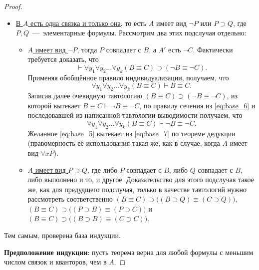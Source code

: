 \begin{proof}
\begin{itemize}
        \item \underline{В $A$ есть одна связка и только она}, то есть $A$ имеет вид $\neg P$ или $P \supset Q$, где $P, Q$~---~элементарные формулы. Рассмотрим два этих подслучая отдельно:
        \begin{itemize}
            \item \underline{$A$ имеет вид $\neg P$}, тогда $P$ совпадает с $B$, а $A'$ есть $\neg C$. Фактически требуется доказать, что
            \begin{equation}\label{eq:base_5}
                \vdash \forall y_1\forall y_2\dots\forall y_k(B \equiv C) \supset (\neg B \equiv \neg C).
            \end{equation}
            Применяя обобщённое правило индивидуализации, получаем, что 
            \begin{equation}\label{eq:base_6}
                \forall y_1\forall y_2\dots\forall y_k(B \equiv C) \vdash B \equiv C. 
            \end{equation}
            Записав далее очевидную тавтологию $(B \equiv C) \supset (\neg B \equiv \neg C)$, из которой вытекает $B \equiv C \vdash \neg B \equiv \neg C$, по правилу сечения из \eqref{eq:base_6} и последовавшей из написанной тавтологии выводимости получаем, что
            \begin{equation}\label{eq:base_7}
                \forall y_1\forall y_2\dots\forall y_k(B \equiv C) \vdash \neg B \equiv \neg C.
            \end{equation}
            Желанное \eqref{eq:base_5} вытекает из \eqref{eq:base_7} по теореме дедукции (правомерность её использования такая же, как в случае, когда $A$ имеет вид $\forall xP$).

            \item \underline{$A$ имеет вид $P \supset Q$}, где либо $P$ совпадает с $B$, либо $Q$ совпадает с $B$, либо выполнено и то, и другое. Доказательство для этого подслучая такое же, как для предудщего подслучая, только в качестве тавтологий нужно рассмотреть соответственно $(B \equiv C) \supset \big((B \supset Q) \equiv (C \supset Q)\big)$, $(B \equiv C) \supset \big((P \supset B) \equiv (P \supset C)\big)$ и $(B \equiv C) \supset \big((B \supset B) \equiv (C \supset C)\big)$.
        \end{itemize}
    \end{itemize}

    Тем самым, проверена база индукции.

    \textbf{Предположение индукции}: пусть теорема верна для любой формулы с меньшим числом связок и кванторов, чем в $A$. 


\end{proof}
